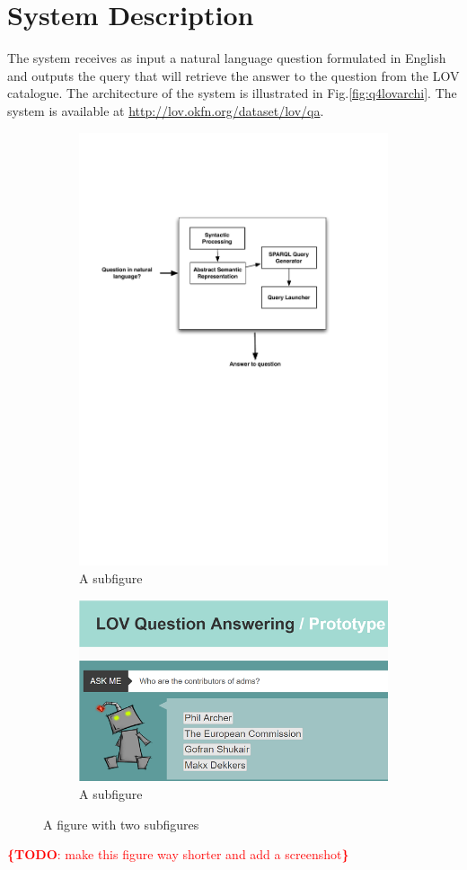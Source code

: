\documentclass[runningheads,a4paper]{llncs}
\newcommand{\todo}[1]{\noindent\textcolor{red}{{\bf \{TODO}: #1{\bf \}}}}
\begin{document}
\section{System Description}
\label{sec:system}

The system receives as input a natural language question formulated in English and outputs the query that will retrieve the answer to the question from the LOV catalogue. The architecture of the system is illustrated in Fig.\ref{fig:q4lovarchi}. The system is available at \url{http://lov.okfn.org/dataset/lov/qa}.

\begin{figure}
\centering
\begin{subfigure}
  \centering
  \includegraphics[width=.4\linewidth]{img/qa4lov-archi.pdf}
  \caption{A subfigure}
  \label{fig:sub1}
\end{subfigure}%
\begin{subfigure}
  \centering
  \includegraphics[width=.4\linewidth]{img/qa-screenshot.png}
  \caption{A subfigure}
  \label{fig:sub2}
\end{subfigure}
\caption{A figure with two subfigures}
\label{fig:test}
\end{figure}




\todo{make this figure way shorter and add a screenshot}
\end{document}
